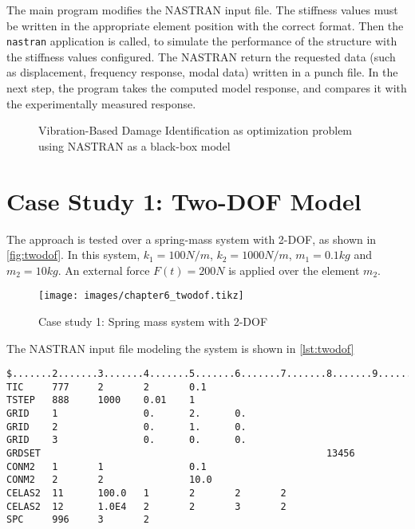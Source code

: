 The main program modifies the NASTRAN input file. The stiffness values must be written in the appropriate element position with the correct format. Then the \texttt{nastran} application is called, to simulate the performance of the structure with the stiffness values configured. The NASTRAN return the requested data (such as displacement, frequency response, modal data) written in a punch file. In the next step, the program takes the computed model response, and compares it with the experimentally measured response.

\begin{figure}[H]
    \caption{Vibration-Based Damage Identification as optimization problem using NASTRAN as a black-box model}
    \label{fig:inversenastran}
    \centering
    \vspace{1em}
\end{figure}

\section{Case Study 1: Two-DOF Model}
\label{sec:twodof}

The approach is tested over a spring-mass system with 2-DOF, as shown in  \autoref{fig:twodof}. In this system, $k_{1} = 100 N/m$, $k_{2} = 1000 N/m$, $m_{1} = 0.1kg$ and $m_{2} = 10kg$. An external force $F(t) = 200N$ is applied over the element $m_2$.

\begin{figure}[H]
\caption{Case study 1: Spring mass system with 2-DOF}
\label{fig:twodof}
\centering
\texttt{[image: images/chapter6\_twodof.tikz]}
\end{figure}

The NASTRAN input file modeling the system is shown in \autoref{lst:twodof}

\begin{lstlisting}[caption={NASTRAN input file for Two-DOF model},label={lst:twodof}]
$.......2.......3.......4.......5.......6.......7.......8.......9.......10.....$
TIC     777     2       2       0.1
TSTEP   888     1000    0.01    1    
GRID    1               0.      2.      0.
GRID    2               0.      1.      0.
GRID    3               0.      0.      0.
GRDSET                                                  13456
CONM2   1       1               0.1
CONM2   2       2               10.0 
CELAS2  11      100.0   1       2       2       2
CELAS2  12      1.0E4   2       2       3       2
SPC     996     3       2
\end{lstlisting}

